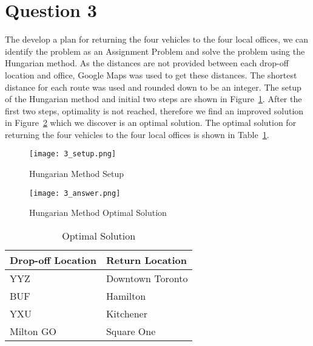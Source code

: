 \section*{Question 3}
The develop a plan for returning the four vehicles to the four local offices, we can identify the problem as an Assignment Problem and solve the problem using the Hungarian method. As the distances are not provided between each drop-off location and office, Google Maps was used to get these distances. The shortest distance for each route was used and rounded down to be an integer. The setup of the Hungarian method and initial two steps are shown in Figure~\ref{fig:q3_initial}. After the first two steps, optimality is not reached, therefore we find an improved solution in Figure~\ref{fig:q3_answer} which we discover is an optimal solution. The optimal solution for returning the four vehicles to the four local offices is shown in Table~\ref{tab:q3}.

\begin{figure}[htp]
\centering
\caption{\label{fig:q3_initial}Hungarian Method Setup}
\texttt{[image: 3\_setup.png]}
\end{figure}

\begin{figure}[htp]
\centering
\caption{\label{fig:q3_answer}Hungarian Method Optimal Solution}
\texttt{[image: 3\_answer.png]}
\end{figure}

\begin{table}[htp]
\centering
\caption{\label{tab:q3}Optimal Solution}
\begin{tabular}{|l|l|}
	\hline
	Drop-off Location & Return Location  \\ \hline
	YYZ               & Downtown Toronto \\ \hline
	BUF               & Hamilton         \\ \hline
	YXU               & Kitchener        \\ \hline
	Milton GO         & Square One       \\ \hline
\end{tabular}
\end{table}